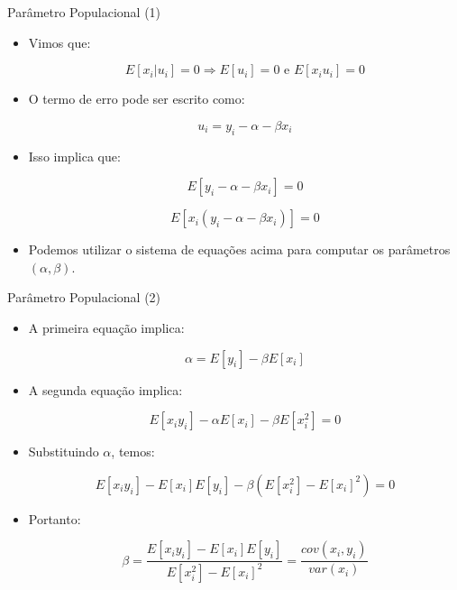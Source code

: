 \documentclass[10pt,slides,xcolor=pdftex,dvipsnames,table]{beamer}
\begin{document}

\begin{frame}{Parâmetro Populacional (1)}

\begin{itemize}\itemsep1.2em

\item Vimos que: 

$$ E[x_i | u_i] = 0 \Longrightarrow  E[u_i] = 0 \text{ e } E[x_i u_i ] =0 $$

\item O termo de erro pode ser escrito como:

$$ u_i = y_i - \alpha - \beta x_i $$ 

\item Isso implica que: 

$$ E[y_i - \alpha - \beta x_i] = 0$$

$$ E[x_i (y_i - \alpha - \beta x_i)] = 0 $$

\item Podemos utilizar o sistema de equações acima para computar os parâmetros $(\alpha, \beta)$.

\end{itemize}

\end{frame}


\begin{frame}{Parâmetro Populacional (2)}

\begin{itemize}\itemsep1.2em

\item A primeira equação implica:

$$ \alpha = E[y_i] - \beta E[x_i] $$

\item A segunda equação implica:

$$ E[x_i y_i] - \alpha E[x_i] - \beta E [x_i^2] = 0 $$

\item Substituindo $\alpha$, temos:

$$ E[x_i y_i] - E[x_i] E[y_i] - \beta \left( E [x_i^2] - E[x_i]^2 \right) = 0 $$  

\item Portanto:

$$ \beta = \frac{E[x_i y_i] - E[x_i] E[y_i]}{E [x_i^2] - E[x_i]^2} = \frac{cov(x_i,y_i)}{var (x_i)} $$

\end{itemize}

\end{frame}
\end{document}

